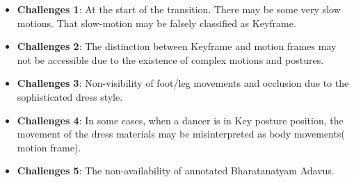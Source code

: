 \begin{itemize}
    \item \textbf{Challenges 1}: At the start of the transition. There may be some very slow motions. That slow-motion may be falsely classified as Keyframe.
    
    \item \textbf{Challenges 2}: The distinction between Keyframe and motion frames may not be accessible due to the existence of complex motions and postures.
    
    \item \textbf{Challenges 3}: Non-visibility of foot/leg movements and occlusion due to the sophisticated dress style.
    
    \item \textbf{Challenges 4}: In some cases, when a dancer is in Key posture position, the movement of the dress materials may be misinterpreted as body movements( motion frame).
    
    \item \textbf{Challenges 5}: The non-availability of annotated Bharatanatyam Adavus.
\end{itemize}
